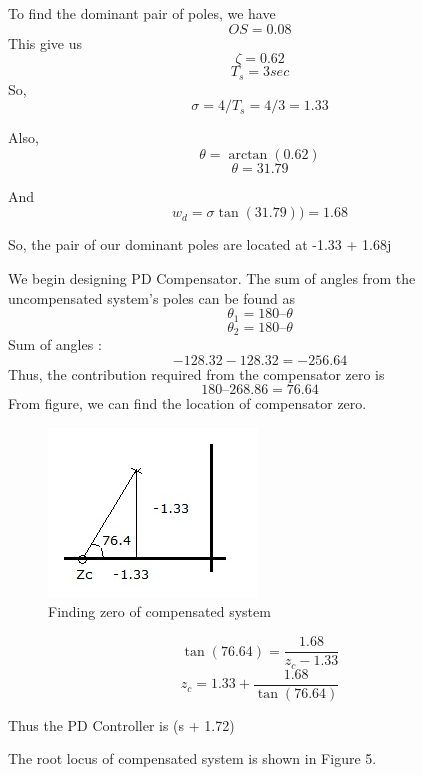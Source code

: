 \documentclass{article}
\begin{document}
To find the dominant pair of poles, we have
\[ OS = 0.08\]
This give us \[ \zeta = 0.62 \]
\[ T_s = 3 sec\]
So, 
\[ \sigma = 4/T_s = 4/3 = 1.33\]

Also, 
\[ \theta = \arctan(0.62)\]
\[ \theta = 31.79\]

And 
\[w_d = \sigma \tan(31.79)) = 1.68\]

So, the pair of our dominant poles are located at -1.33 + 1.68j

We begin designing PD Compensator. The sum of angles from the 
uncompensated system’s poles can be found as
\[\theta_1 = 180 – \theta \]
\[\theta_2 = 180 – \theta \]
Sum of angles : \[-128.32 -128.32 = -256.64\]
Thus, the contribution required from the compensator zero is 
\[180 – 268.86 = 76.64\]
From figure, we can find the location of compensator zero.
\begin{figure}[h]
  \includegraphics[width=\linewidth]{zero_pd.jpg}
  \caption{Finding zero of compensated system}
  \label{fig:boat1}
\end{figure}

\[\tan(76.64) = \frac{1.68}{z_c - 1.33}\]
\[ z_c = 1.33 + \frac{1.68}{\tan(76.64)} \]

Thus the PD Controller is (s + 1.72)

The root locus of compensated system is shown in Figure 5.
\end{document}
